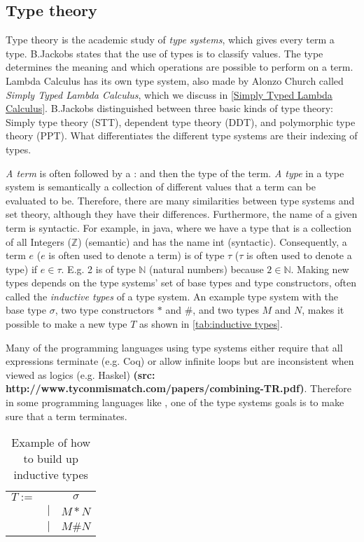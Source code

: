 \subsection{Type theory}
\label{type theory}
Type theory is the academic study of \emph{type systems}, which gives every term a type. B.Jackobs \autocite[2]{JacobsBart1999Clat} states that the use of types is to classify values. The type determines the meaning and which operations are possible to perform on a term. Lambda Calculus has its own type system, also made by Alonzo Church called \emph{Simply Typed Lambda Calculus}, which we discuss in \autoref{Simply Typed Lambda Calculus}. B.Jackobs \autocite[3]{JacobsBart1999Clat} distinguished between three basic kinds of type theory: Simply type theory (STT), dependent type theory (DDT), and polymorphic type theory (PPT).  What differentiates the different type systems are their indexing of types.

\para
\emph{A term} is often followed by a : and then the type of the term. \emph{A type} in a type system is semantically a collection of different values that a term can be evaluated to be. Therefore, there are many similarities between type systems and set theory, although they have their differences. Furthermore, the name of a given term is syntactic. For example, in java, where we have a type that is a collection of all Integers ($\mathbb{Z}$) (semantic) and has the name int (syntactic). Consequently, a term $e$ ($e$ is often used to denote a term) is of type $\tau$ ($\tau$ is often used to denote a type) if $e \in \tau$. E.g. 2 is of type $\mathbb{N}$ (natural numbers) because $2 \in \mathbb{N}$. Making new types depends on the type systems' set of base types and type constructors, often called the \emph{inductive types} of a type system. An example type system with the base type $\sigma$, two type constructors $*$ and $\#$, and two types $M$ and $N$, makes it possible to make a new type $T$ as shown in \autoref{tab:inductive types}.

\para
Many of the programming languages using type systems either require that all expressions terminate (e.g. Coq) or allow infinite loops but are inconsistent when viewed as logics (e.g. Haskel) \textbf{(src: http://www.tyconmismatch.com/papers/combining-TR.pdf)}. Therefore in some programming languages like , one of the type systems goals is to make sure that a term terminates. 

\begin{table}[]
    \centering
    \begin{tabular}{c c c}
         $T :=$&  & $\sigma$\\
         & $|$ & $M * N$ \\
         & $|$ & $M \# N$ \\
    \end{tabular}
    \caption{Example of how to build up inductive types}
    \label{tab:inductive types}
\end{table}


